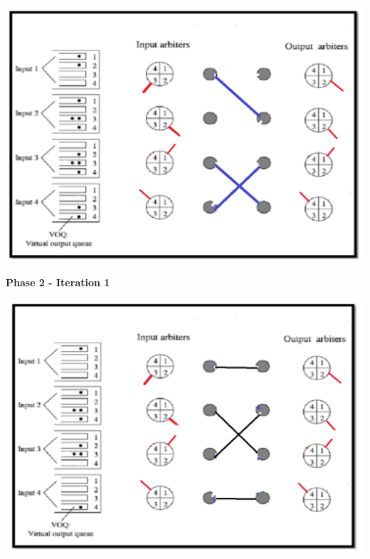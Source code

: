 \begin{qsolve}
	\begin{latin}
		
		\begin{center}
			\includegraphics*[width=0.7\linewidth]{pics/img9.png}
		\end{center}
		
		
		\textbf{Phase 2 - Iteration 1}\\
		\begin{center}
			\includegraphics*[width=0.7\linewidth]{pics/img10.png}
		\end{center}
		
	\end{latin}
\end{qsolve}
\newpage



